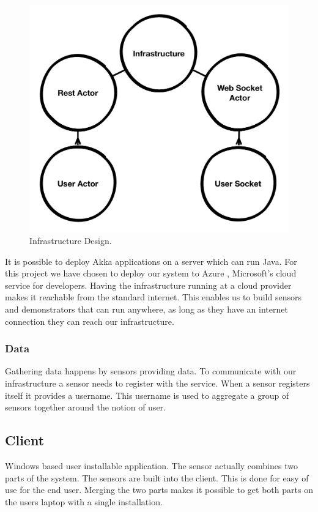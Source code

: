 \documentclass{sigchi}
\begin{document}
\begin{figure}[H]
  \centering
  \includegraphics[width=\columnwidth]{figures/infrastructure_design.pdf}
  \caption{Infrastructure Design.}
  \label{fig:infrastructure}
\end{figure}

It is possible to deploy Akka applications on a server which can run Java.
For this project we have chosen to deploy our system to Azure \cite{azure}, Microsoft's cloud service for developers.
Having the infrastructure running at a cloud provider makes it reachable from the standard internet.
This enables us to build sensors and demonstrators that can run anywhere, as long as they have an internet connection they can reach our infrastructure.

\subsubsection{Data}
Gathering data happens by sensors providing data.
To communicate with our infrastructure a sensor needs to register with the service.
When a sensor registers itself it provides a username.
This username is used to aggregate a group of sensors together around the notion of user.

\subsection{Client}
Windows based user installable application.
The sensor actually combines two parts of the system.
The sensors are built into the client.
This is done for easy of use for the end user.
Merging the two parts makes it possible to get both parts on the users laptop with a single installation.
\end{document}
